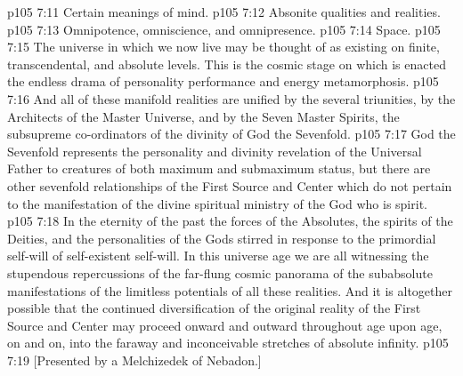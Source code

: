 \vs p105 7:11 \bibnobreakspace Certain meanings of mind.
\vs p105 7:12 \bibnobreakspace Absonite qualities and realities.
\vs p105 7:13 \bibnobreakspace Omnipotence, omniscience, and omnipresence.
\vs p105 7:14 \bibnobreakspace Space.
\vs p105 7:15 \pc The universe in which we now live may be thought of as existing on finite, transcendental, and absolute levels. This is the cosmic stage on which is enacted the endless drama of personality performance and energy metamorphosis.
\vs p105 7:16 And all of these manifold realities are unified  by the several triunities,  by the Architects of the Master Universe, and  by the Seven Master Spirits, the subsupreme co\hyp{}ordinators of the divinity of God the Sevenfold.
\vs p105 7:17 God the Sevenfold represents the personality and divinity revelation of the Universal Father to creatures of both maximum and submaximum status, but there are other sevenfold relationships of the First Source and Center which do not pertain to the manifestation of the divine spiritual ministry of the God who is spirit.
\vs p105 7:18 \pc In the eternity of the past the forces of the Absolutes, the spirits of the Deities, and the personalities of the Gods stirred in response to the primordial self\hyp{}will of self\hyp{}existent self\hyp{}will. In this universe age we are all witnessing the stupendous repercussions of the far\hyp{}flung cosmic panorama of the subabsolute manifestations of the limitless potentials of all these realities. And it is altogether possible that the continued diversification of the original reality of the First Source and Center may proceed onward and outward throughout age upon age, on and on, into the faraway and inconceivable stretches of absolute infinity.
\vsetoff
\vs p105 7:19 [Presented by a Melchizedek of Nebadon.]
